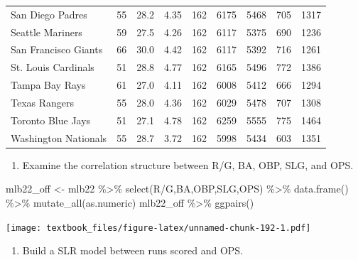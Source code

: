 \documentclass[
  11pt,
]{book}
\newenvironment{Shaded}{\begin{snugshade}}{\end{snugshade}}
\newcommand{\AttributeTok}[1]{\textcolor[rgb]{0.77,0.63,0.00}{#1}}
\newcommand{\FunctionTok}[1]{\textcolor[rgb]{0.00,0.00,0.00}{#1}}
\newcommand{\NormalTok}[1]{#1}
\newcommand{\OtherTok}[1]{\textcolor[rgb]{0.56,0.35,0.01}{#1}}
\newcommand{\SpecialCharTok}[1]{\textcolor[rgb]{0.00,0.00,0.00}{#1}}
\newcommand{\StringTok}[1]{\textcolor[rgb]{0.31,0.60,0.02}{#1}}
\providecommand{\tightlist}{%
  \setlength{\itemsep}{0pt}\setlength{\parskip}{0pt}}
\theoremstyle{definition}
\theoremstyle{definition}
\theoremstyle{definition}
\theoremstyle{definition}
\theoremstyle{remark}
\begin{document}
\begin{tabular}{lllllllll}
San Diego Padres & 55 & 28.2 & 4.35 & 162 & 6175 & 5468 & 705 & 1317\\
Seattle Mariners & 59 & 27.5 & 4.26 & 162 & 6117 & 5375 & 690 & 1236\\
San Francisco Giants & 66 & 30.0 & 4.42 & 162 & 6117 & 5392 & 716 & 1261\\
\addlinespace
St. Louis Cardinals & 51 & 28.8 & 4.77 & 162 & 6165 & 5496 & 772 & 1386\\
Tampa Bay Rays & 61 & 27.0 & 4.11 & 162 & 6008 & 5412 & 666 & 1294\\
Texas Rangers & 55 & 28.0 & 4.36 & 162 & 6029 & 5478 & 707 & 1308\\
Toronto Blue Jays & 51 & 27.1 & 4.78 & 162 & 6259 & 5555 & 775 & 1464\\
Washington Nationals & 55 & 28.7 & 3.72 & 162 & 5998 & 5434 & 603 & 1351\\
\bottomrule
\end{tabular}

\newpage

\begin{enumerate}
\def\labelenumi{(\alph{enumi})}
\setcounter{enumi}{1}
\tightlist
\item
  Examine the correlation structure between R/G, BA, OBP, SLG, and OPS.
\end{enumerate}

\begin{Shaded}
\begin{Highlighting}[]
\NormalTok{mlb22\_off }\OtherTok{\textless{}{-}}\NormalTok{ mlb22 }\SpecialCharTok{\%\textgreater{}\%} \FunctionTok{select}\NormalTok{(}\StringTok{\textasciigrave{}}\AttributeTok{R/G}\StringTok{\textasciigrave{}}\NormalTok{,BA,OBP,SLG,OPS) }\SpecialCharTok{\%\textgreater{}\%} \FunctionTok{data.frame}\NormalTok{() }\SpecialCharTok{\%\textgreater{}\%} \FunctionTok{mutate\_all}\NormalTok{(as.numeric)}
\NormalTok{mlb22\_off }\SpecialCharTok{\%\textgreater{}\%} \FunctionTok{ggpairs}\NormalTok{()}
\end{Highlighting}
\end{Shaded}

\texttt{[image: textbook\_files/figure-latex/unnamed-chunk-192-1.pdf]}

\newpage

\begin{enumerate}
\def\labelenumi{(\alph{enumi})}
\setcounter{enumi}{2}
\tightlist
\item
  Build a SLR model between runs scored and OPS.
\end{enumerate}
\end{document}

